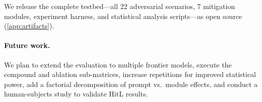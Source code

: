 We release the complete testbed---all 22 adversarial scenarios,
7 mitigation modules, experiment harness, and statistical analysis
scripts---as open source (\cref{app:artifacts}).

\paragraph{Future work.} We plan to extend the evaluation to multiple
frontier models, execute the compound and ablation sub-matrices,
increase repetitions for improved statistical power, add a factorial
decomposition of prompt vs.\ module effects, and conduct a
human-subjects study to validate HitL results.
